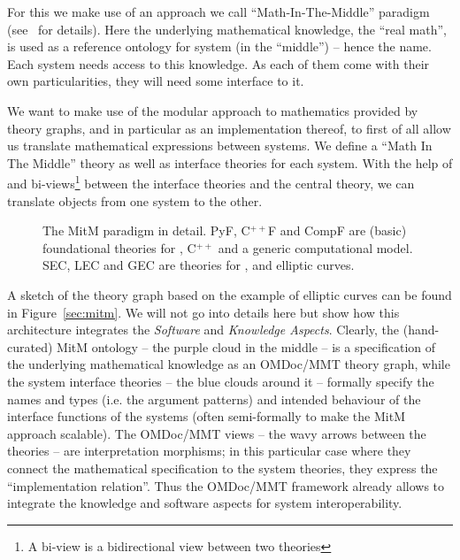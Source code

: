 For this we make use of an approach we call ``Math-In-The-Middle'' paradigm
(see~\cite{DehKohKon:iop16} for details). Here the underlying mathematical knowledge, the
``real math'', is used as a reference ontology for system (in the ``middle'') -- hence the
name. Each system needs access to this knowledge. As each of them come with their own
particularities, they will need some interface to it.

We want to make use of the modular approach to mathematics provided by theory graphs, and
in particular \MMT as an implementation thereof, to first of all allow us translate
mathematical expressions between systems. We define a ``Math In The Middle'' theory as
well as interface theories for each system. With the help of \MMT and bi-views\footnote{A
  bi-view is a bidirectional view between two theories} between the interface theories and
the central theory, we can translate objects from one system to the other.

\begin{figure}[ht]\centering
  \def\myxscale{3}\def\myyscale{1.2}
  
  \caption{The MitM paradigm in detail. PyF, C${}^{++}$F and CompF are (basic)
    foundational theories for \python, C${}^{++}$ and a generic computational model. SEC,
    LEC and GEC are theories for \SageMath, \LMFDB and \GAP elliptic curves.}\label{fig:mitm}
\end{figure}

A sketch of the theory graph based on the example of elliptic curves can be found in
Figure~\ref{sec:mitm}. We will not go into details here but show how this architecture
integrates the \emph{Software} and \emph{Knowledge Aspects}. Clearly, the (hand-curated)
MitM ontology -- the purple cloud in the middle -- is a specification of the underlying
mathematical knowledge as an OMDoc/MMT theory graph, while the system interface theories
-- the blue clouds around it -- formally specify the names and types (i.e. the argument
patterns) and intended behaviour of the interface functions of the systems (often
semi-formally to make the MitM approach scalable). The OMDoc/MMT views -- the wavy arrows
between the theories -- are interpretation morphisms; in this particular case where they
connect the mathematical specification to the system theories, they express the
``implementation relation''. Thus the OMDoc/MMT framework already allows to integrate the
knowledge and software aspects for system interoperability.

